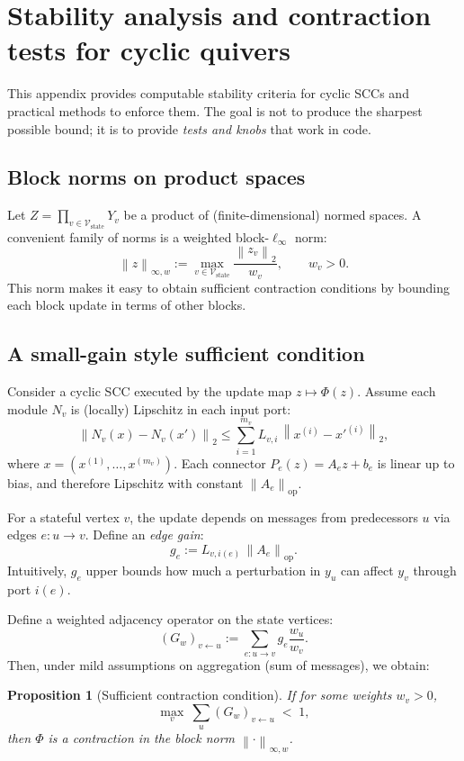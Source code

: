 \documentclass[11pt]{article}
\theoremstyle{definition}
\theoremstyle{plain}
\newtheorem{proposition}{Proposition}[section]
\theoremstyle{remark}
\newcommand{\norm}[1]{\left\lVert #1 \right\rVert}
\newcommand{\opnorm}[1]{\left\lVert #1 \right\rVert_{\mathrm{op}}}
\newcommand{\mc}[1]{\mathcal{#1}}
\newcommand{\Nodes}{\mc{V}}
\begin{document}
\section{Stability analysis and contraction tests for cyclic quivers}
\label{sec:stability}

This appendix provides computable stability criteria for cyclic SCCs and practical methods to enforce them.
The goal is not to produce the sharpest possible bound; it is to provide \emph{tests and knobs} that work in code.

\subsection{Block norms on product spaces}
Let $Z=\prod_{v\in\Nodes_\mathrm{state}} Y_v$ be a product of (finite-dimensional) normed spaces.
A convenient family of norms is a weighted block-$\ell_\infty$ norm:
\[
\norm{z}_{\infty,w} := \max_{v\in\Nodes_\mathrm{state}} \frac{\norm{z_v}_2}{w_v},
\qquad w_v>0.
\]
This norm makes it easy to obtain sufficient contraction conditions by bounding each block update in terms of other blocks.

\subsection{A small-gain style sufficient condition}
Consider a cyclic SCC executed by the update map $z\mapsto \Phi(z)$.
Assume each module $N_v$ is (locally) Lipschitz in each input port:
\[
\norm{N_v(x)-N_v(x')}_2 \le \sum_{i=1}^{m_v} L_{v,i}\,\norm{x^{(i)}-x'^{(i)}}_2,
\]
where $x=(x^{(1)},\dots,x^{(m_v)})$.
Each connector $P_e(z)=A_e z+b_e$ is linear up to bias, and therefore Lipschitz with constant $\opnorm{A_e}$.

For a stateful vertex $v$, the update depends on messages from predecessors $u$ via edges $e:u\to v$.
Define an \emph{edge gain}:
\[
g_e := L_{v,i(e)}\,\opnorm{A_e}.
\]
Intuitively, $g_e$ upper bounds how much a perturbation in $y_u$ can affect $y_v$ through port $i(e)$.

Define a weighted adjacency operator on the state vertices:
\[
(G_w)_{v\leftarrow u} := \sum_{e:u\to v} g_e \frac{w_u}{w_v}.
\]
Then, under mild assumptions on aggregation (sum of messages), we obtain:
\begin{proposition}[Sufficient contraction condition]
If for some weights $w_v>0$,
\[
\max_{v}\ \sum_{u} (G_w)_{v\leftarrow u} \;<\; 1,
\]
then $\Phi$ is a contraction in the block norm $\norm{\cdot}_{\infty,w}$.
\end{proposition}
\end{document}
